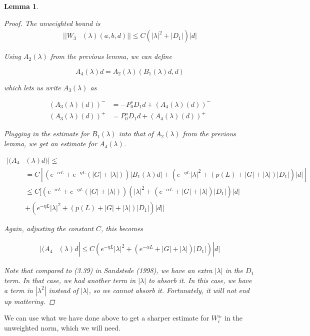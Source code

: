 \documentclass[12pt]{article}
\newtheorem{lemma}{Lemma}
\begin{document}
\begin{lemma}
\begin{proof}
The unweighted bound is
\begin{align*}
||W_3&(\lambda)(a,b,d)|| \leq C \left( |\lambda|^2 + |D_1|\right)|d|
\end{align*} 


Using $A_2(\lambda)$ from the previous lemma, we can define

\[
A_4(\lambda)d = A_2(\lambda)(B_1(\lambda)d,d)
\]

which lets us write $A_3(\lambda)$ as 

\begin{align*}
(A_3(\lambda)(d))^- &= -P_0^s D_1 d + (A_4(\lambda)(d))^-\\
(A_3(\lambda)(d))^+ &= P_0^u D_1 d + (A_4(\lambda)(d))^+
\end{align*}

Plugging in the estimate for $B_1(\lambda)$ into that of $A_2(\lambda)$ from the previous lemma, we get an estimate for $A_4(\lambda)$.

\begin{align*}
|(A_4&(\lambda)d)| \leq \\
&= C \left[ \left( e^{-\alpha L} + e^{-\eta L} \left(|G| + |\lambda|\right)\right) |B_1(\lambda)d|
+ \left( e^{-\eta L} |\lambda|^2 + \left( p(L) + |G| + |\lambda| \right)|D_1| \right)|d| \right]\\
&\leq C [ \left( e^{-\alpha L} + e^{-\eta L} \left(|G| + |\lambda|\right)\right) (|\lambda|^2 + (e^{-\alpha L} + |G| + |\lambda|)|D_1| )|d|\\
&+ \left( e^{-\eta L} |\lambda|^2 + \left( p(L) + |G| + |\lambda| \right)|D_1| \right)|d| ]
\end{align*}

Again, adjusting the constant $C$, this becomes

\begin{align*}
|(A_4&(\lambda)d| \leq C ( e^{-\eta L}|\lambda|^2 + (e^{-\alpha L} + |G| + |\lambda|)|D_1|)|d|
\end{align*}

Note that compared to (3.39) in Sandstede (1998), we have an extra $|\lambda|$ in the $D_1$ term. In that case, we had another term in $|\lambda|$ to absorb it. In this case, we have a term in $|\lambda^2|$ instead of $|\lambda|$, so we cannot absorb it. Fortunately, it will not end up mattering.

\end{proof}
\end{lemma}

We can use what we have done above to get a sharper estimate for $W_i^\pm$ in the unweighted norm, which we will need.
\end{document}
